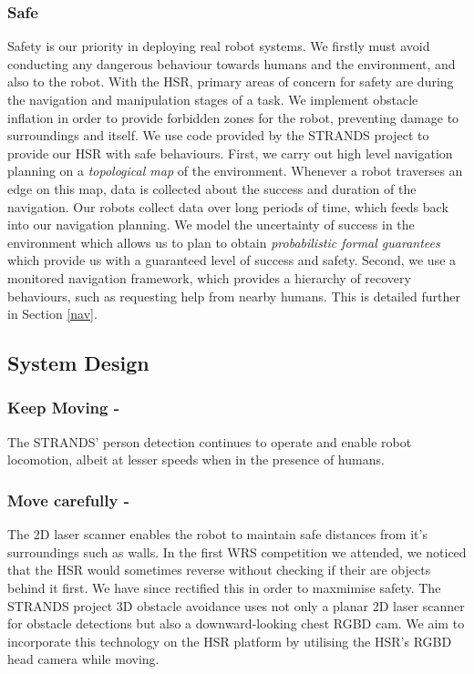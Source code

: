 \documentclass[runningheads,a4paper]{llncs}
\begin{document}
\subsubsection{Safe}
Safety is our priority in deploying real robot systems. We firstly must avoid conducting any dangerous behaviour towards humans and the environment, and also to the robot. With the HSR, primary areas of concern for safety are during the navigation and manipulation stages of a task. We implement obstacle inflation in order to provide forbidden zones for the robot, preventing damage to surroundings and itself. 
We use code provided by the STRANDS project to provide our HSR with safe behaviours. First, we carry out high level navigation planning on a \emph{topological map} of the environment. Whenever a robot traverses an edge on this map, data is collected about the success and duration of the navigation. Our robots collect data over long periods of time, which feeds back into our navigation planning. We model the uncertainty of success in the environment which allows us to plan to obtain \emph{probabilistic formal guarantees} which provide us with a guaranteed level of success and safety. Second, we use a monitored navigation framework, which provides a hierarchy of recovery behaviours, such as requesting help from nearby humans. This is detailed further in Section \ref{nav}.

\subsection{System Design}
\subsubsection{Keep Moving - }
The STRANDS' person detection continues to operate and enable robot locomotion, albeit at lesser speeds when in the presence of humans.

\subsubsection{Move carefully - }
The 2D laser scanner enables the robot to maintain safe distances from it's surroundings such as walls. In the first WRS competition we attended, we noticed that the HSR would sometimes reverse without checking if their are objects behind it first. We have since rectified this in order to maxmimise safety. The STRANDS project 3D obstacle avoidance uses not only a planar 2D laser scanner for obstacle detections but also a downward-looking chest RGBD cam. We aim to incorporate this technology on the HSR platform by utilising the HSR's RGBD head camera while moving. 
\end{document}
